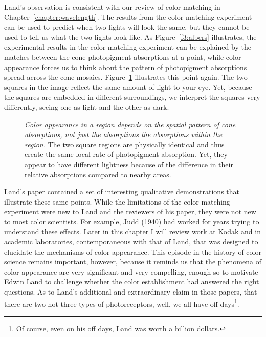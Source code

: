 Land's observation is consistent with our review of color-matching in
Chapter~\ref{chapter:wavelength}.  The results from the color-matching
experiment can be used to predict when two lights will look the same,
but they cannot be used to tell us what the two lights look like.  As
Figure~\ref{f3:albers} illustrates, the experimental results in the
color-matching experiment can be explained by the matches between the
cone photopigment absorptions at a point, while color appearance
forces us to think about the pattern of photopigment absorptions
spread across the cone mosaics.  Figure~\ref{f8:contrast} illustrates
this point again.  The two squares in the image reflect the same
amount of light to your eye.  Yet, because the squares are embedded in
different surroundings, we interpret the squares very differently,
seeing one as light and the other as dark.
\begin{figure}
\centerline{
}
\caption[Contrast illusion]{
{\em Color appearance in a region depends on the spatial pattern of
cone absorptions, not just the absorptions the absorptions within the
region.}  The two square regions are physically identical and thus
create the same local rate of photopigment absorption.  Yet, they
appear to have different lightness because of the difference in their
relative absorptions compared to nearby areas.}
\label{f8:contrast}
\end{figure}

Land's paper contained a set of interesting qualitative demonstrations
that illustrate these same points.  While the limitations of the
color-matching experiment were new to Land and the reviewers of his
paper, they were not new to most color scientists.  For example, Judd
(1940) had worked for years trying to understand these effects.  Later
in this chapter I will review work at Kodak and in academic
laboratories, contemporaneous with that of Land, that was designed to
elucidate the mechanisms of color appearance.  This episode in the
history of color science remains important, however, because it
reminds us that the phenomena of color appearance are very significant
and very compelling, enough so to motivate Edwin Land to challenge
whether the color establishment had answered the right questions.  As
to Land's additional and extraordinary claim in those papers, that
there are two not three types of photoreceptors, well, we all have off
days\footnote{ Of course, even on his off days, Land was worth a
billion dollars.}.

